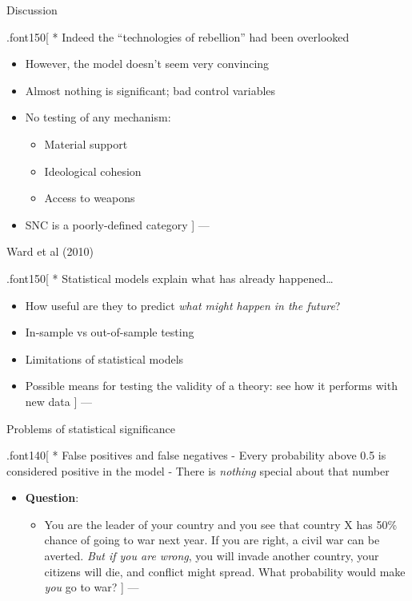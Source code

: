\documentclass[ignorenonframetext,]{beamer}
\providecommand{\tightlist}{%
  \setlength{\itemsep}{0pt}\setlength{\parskip}{0pt}}
\begin{document}
\begin{frame}{Discussion}

.font150{[} * Indeed the ``technologies of rebellion'' had been
overlooked

\begin{itemize}
\item
  However, the model doesn't seem very convincing
\item
  Almost nothing is significant; bad control variables
\item
  No testing of any mechanism:

  \begin{itemize}
  \tightlist
  \item
    Material support
  \item
    Ideological cohesion
  \item
    Access to weapons
  \end{itemize}
\item
  SNC is a poorly-defined category {]} ---
\end{itemize}

\end{frame}

\begin{frame}{Ward et al (2010)}

.font150{[} * Statistical models explain what has already
happened\ldots{}

\begin{itemize}
\item
  How useful are they to predict \emph{what might happen in the future}?
\item
  In-sample vs out-of-sample testing
\item
  Limitations of statistical models
\item
  Possible means for testing the validity of a theory: see how it
  performs with new data {]} ---
\end{itemize}

\end{frame}

\begin{frame}{Problems of statistical significance}

.font140{[} * False positives and false negatives - Every probability
above 0.5 is considered positive in the model - There is \emph{nothing}
special about that number

\begin{itemize}
\tightlist
\item
  \textbf{Question}:

  \begin{itemize}
  \tightlist
  \item
    You are the leader of your country and you see that country X has
    50\% chance of going to war next year. If you are right, a civil war
    can be averted. \emph{But if you are wrong}, you will invade another
    country, your citizens will die, and conflict might spread. What
    probability would make \emph{you} go to war? {]} ---
  \end{itemize}
\end{itemize}

\end{frame}
\end{document}
